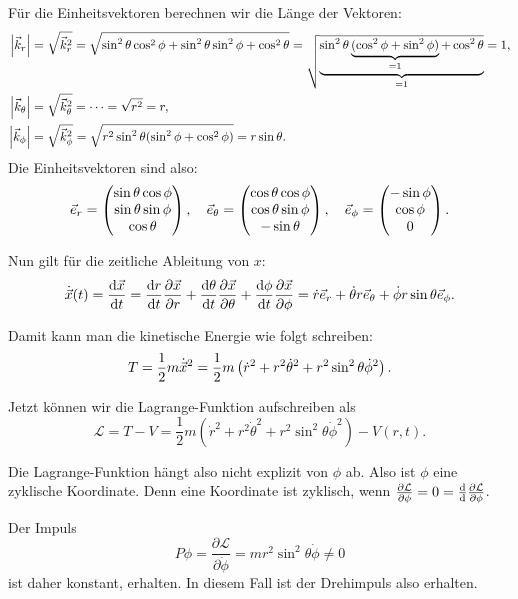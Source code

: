 Für die Einheitsvektoren berechnen wir die Länge der Vektoren:
\begin{align*}
	\left\lvert \vec{k}_r \right\rvert &= \sqrt{\vec{k}_r^2} = \sqrt{\sin^2 \theta \cos^2 \phi + \sin^2 \theta \sin^2 \phi + \cos^2 \theta} = \sqrt{\underbrace{\sin^2 \theta \underbrace{(\cos^2 \phi + \sin^2 \phi)}_{ = 1} + \cos^2 \theta}_{= 1}} = 1, \\
	\left\lvert \vec{k}_\theta \right\rvert &= \sqrt{\vec{k}_\theta^2} = \dots = \sqrt{r^2} = r, \\
	\left\lvert \vec{k}_\phi \right\rvert &= \sqrt{\vec{k}_\phi^2} = \sqrt{r^2 \sin^2 \theta (\sin^2 \phi + \cos^2 \phi)} = r \sin \theta
	\text{.}
\end{align*}
Die Einheitsvektoren sind also:
\[
	\vec{e}_r = \begin{pmatrix} \sin \theta \cos \phi \\ \sin \theta \sin \phi \\ \cos \theta \end{pmatrix},
	\quad 
	\vec{e}_\theta = \begin{pmatrix} \cos \theta \cos \phi \\ \cos \theta \sin \phi \\ - \sin \theta \end{pmatrix},
	\quad 
	\vec{e}_\phi = \begin{pmatrix} - \sin \phi \\ \cos \phi \\ 0 \end{pmatrix}
	\text{.}
\]

Nun gilt für die zeitliche Ableitung von $x$:
\[
	\dot{\vec{x}}(t) 
	= \frac{\mathrm{d}\vec{x}}{\mathrm{d}t} 
	= \frac{\mathrm{d}r}{\mathrm{d}t} \frac{\partial \vec{x}}{\partial r}
	+ \frac{\mathrm{d}\theta}{\mathrm{d}t} \frac{\partial \vec{x}}{\partial \theta} 
	+ \frac{\mathrm{d}\phi}{\mathrm{d}t} \frac{\partial \vec{x}}{\partial \phi}
	= \dot{r} \vec{e}_r + \dot{\theta} r \vec{e}_\theta + \dot{\phi} r \sin \theta \vec{e}_\phi
	\text{.}
\]

Damit kann man die kinetische Energie wie folgt schreiben:
\[
	T = \frac{1}{2} m \dot{\vec{x}}^2 = \frac{1}{2} m \left( \dot{r}^2 + r^2 \dot{\theta}^2 + r^2 \sin^2 \theta \dot{\phi}^2 \right)
	\text{.}
\]

Jetzt können wir die Lagrange-Funktion aufschreiben als 
\[
	\mathcal{L} = T - V = \frac{1}{2} m \left( \dot{r}^2 + r^2 \dot{\theta}^2 + r^2 \sin^2 \theta \dot{\phi}^2 \right) - V(r, t)
	\text{.}
\]

Die Lagrange-Funktion hängt also nicht explizit von $\phi$ ab. Also ist $\phi$ eine zyklische Koordinate. Denn eine Koordinate ist zyklisch, wenn $\frac{\partial \mathcal{L}}{\partial \phi} = 0 = \frac{\mathrm{d}}{\mathrm{d}} \frac{\partial \mathcal{L}}{\partial \phi}$.

Der Impuls 
\[
	P \phi = \frac{\partial \mathcal{L}}{\partial \dot{\phi}} = mr^2 \sin^2 \theta \dot{\phi} \neq 0
\]
ist daher konstant, erhalten. In diesem Fall ist der Drehimpuls also erhalten.

